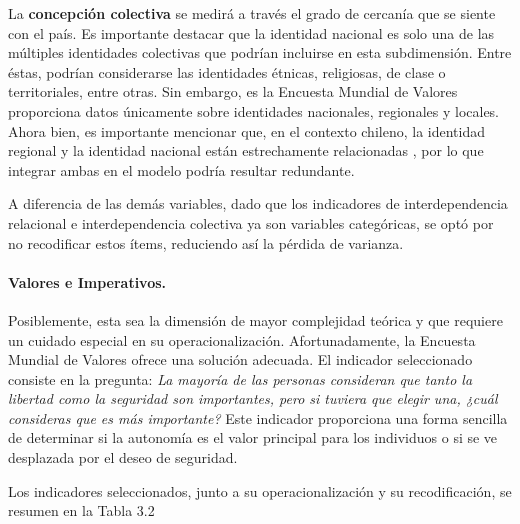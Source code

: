\documentclass[12pt,twoside]{templates/facsothesis}
\begin{document}
La \textbf{concepción colectiva} se medirá a través el grado de cercanía que se siente con el país. Es importante destacar que la identidad nacional es solo una de las múltiples identidades colectivas que podrían incluirse en esta subdimensión. Entre éstas, podrían considerarse las identidades étnicas, religiosas, de clase o territoriales, entre otras. Sin embargo, es la Encuesta Mundial de Valores proporciona datos únicamente sobre identidades nacionales, regionales y locales. Ahora bien, es importante mencionar que, en el contexto chileno, la identidad regional y la identidad nacional están estrechamente relacionadas \citep{zuniga2010}, por lo que integrar ambas en el modelo podría resultar redundante.

A diferencia de las demás variables, dado que los indicadores de interdependencia relacional e interdependencia colectiva ya son variables categóricas, se optó por no recodificar estos ítems, reduciendo así la pérdida de varianza.

\hypertarget{valores-e-imperativos.}{%
\paragraph{Valores e Imperativos.}\label{valores-e-imperativos.}}

Posiblemente, esta sea la dimensión de mayor complejidad teórica y que requiere un cuidado especial en su operacionalización. Afortunadamente, la Encuesta Mundial de Valores ofrece una solución adecuada. El indicador seleccionado consiste en la pregunta: \emph{La mayoría de las personas consideran que tanto la libertad como la seguridad son importantes, pero si tuviera que elegir una, ¿cuál consideras que es más importante?} Este indicador proporciona una forma sencilla de determinar si la autonomía es el valor principal para los individuos o si se ve desplazada por el deseo de seguridad.

Los indicadores seleccionados, junto a su operacionalización y su recodificación, se resumen en la Tabla 3.2
\end{document}
